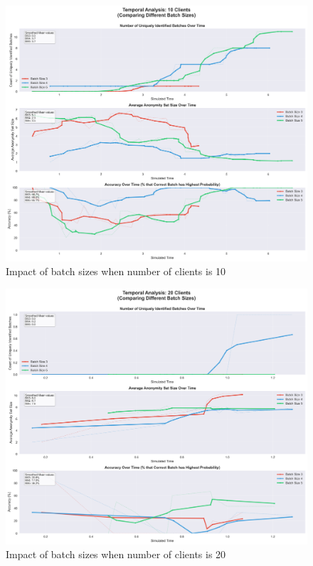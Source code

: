 \documentclass{article}
\begin{document}
\begin{figure}[!htb]
\centering
\includegraphics[width=\textwidth]{diagrams/temporal_5_smoothed_10_clients.png}
\caption{Impact of batch sizes when number of clients is 10}
\label{fig:temporal_analysis_10}
\end{figure}

\begin{figure}[!htb]
\centering
\includegraphics[width=\textwidth]{diagrams/temporal_5_smoothed_20_clients.png}
\caption{Impact of batch sizes when number of clients is 20}
\label{fig:temporal_analysis_20}
\end{figure}
\end{document}
